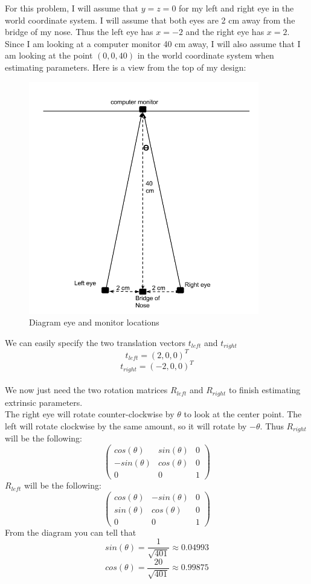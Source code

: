 \documentclass[11pt,psfig]{article}
\begin{document}
For this problem, I will assume that $y=z=0$ for my left and right eye in the world coordinate system. I will assume that both eyes are 2 cm away from the bridge of my nose. Thus the left eye has $x=-2$ and the right eye has $x=2$. Since I am looking at a computer monitor 40 cm away, I will also assume that I am looking at the point $(0,0,40)$ in the world coordinate system when estimating parameters. Here is a view from the top of my design:
\begin{figure}[H]
\centering
\includegraphics[height=4in]{hw1prob2drawing2.png}
\caption{Diagram eye and monitor locations}
\end{figure}
We can easily specify the two translation vectors $t_{left}$ and $t_{right}$\\
\[
t_{left} = (2,0,0)^T
\]
\[
t_{right} = (-2,0,0)^T
\]
\\
We now just need the two rotation matrices $R_{left}$ and $R_{right}$ to finish estimating extrinsic parameters. \\
The right eye will rotate counter-clockwise by $\theta$ to look at the center point. The left will rotate clockwise by the same amount, so it will rotate by $-\theta$. Thus $R_{right}$ will be the following:
\[ \left( \begin{array}{ccc}
cos(\theta) & sin(\theta) & 0  \\
-sin(\theta) & cos(\theta) & 0 \\
0 & 0 & 1
 \end{array} \right)\]
$R_{left}$ will be the following:
\[ \left( \begin{array}{ccc}
cos(\theta) & -sin(\theta) & 0  \\
sin(\theta) & cos(\theta) & 0 \\
0 & 0 & 1
 \end{array} \right)\]
From the diagram you can tell that 
\[
sin(\theta) = \frac{1}{\sqrt{401}} \approx 0.04993
\]
\[
cos(\theta)=\frac{20}{\sqrt{401}} \approx 0.99875
\]
\end{document}
